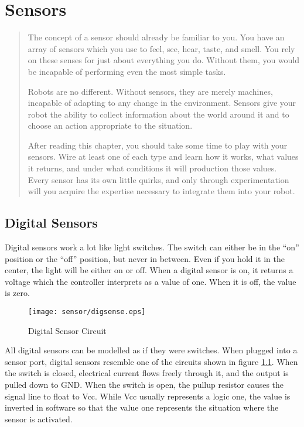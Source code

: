\chapter{Sensors}
\begin{quote}
The concept of a sensor should already be familiar to you. You have an
array of sensors which you use to feel, see, hear, taste, and
smell. You rely on these senses for just about everything you
do. Without them, you would be incapable of performing even the most
simple tasks.

Robots are no different. Without sensors, they are merely machines,
incapable of adapting to any change in the environment. Sensors give
your robot the ability to collect information about the world around
it and to choose an action appropriate to the situation.

After reading this chapter, you should take some time to play with
your sensors. Wire at least one of each type and learn how it works,
what values it returns, and under what conditions it will production
those values. Every sensor has its own little quirks, and only through
experimentation will you acquire the expertise necessary to integrate
them into your robot.
\end{quote}

\section{Digital Sensors}
Digital sensors work a lot like light switches. The switch can either
be in the ``on'' position or the ``off'' position, but never in
between. Even if you hold it in the center, the light will be either
on or off. When a digital sensor is on, it returns a voltage which the
controller interprets as a value of one. When it is off, the value is
zero.

\begin{figure}[htbp]
\begin{center}
\texttt{[image: sensor/digsense.eps]}
\caption{Digital Sensor Circuit}
\label{digsense}
\end{center}
\end{figure}
All digital sensors can be modelled as if they were switches. When
plugged into a sensor port, digital sensors resemble one of the
circuits shown in figure \ref{digsense}. When the switch is closed,
electrical current flows freely through it, and the output is pulled
down to GND. When the switch is open, the pullup resistor causes the
signal line to float to Vcc. While Vcc usually represents a logic one,
the value is inverted in software so that the value one represents the
situation where the sensor is activated.


